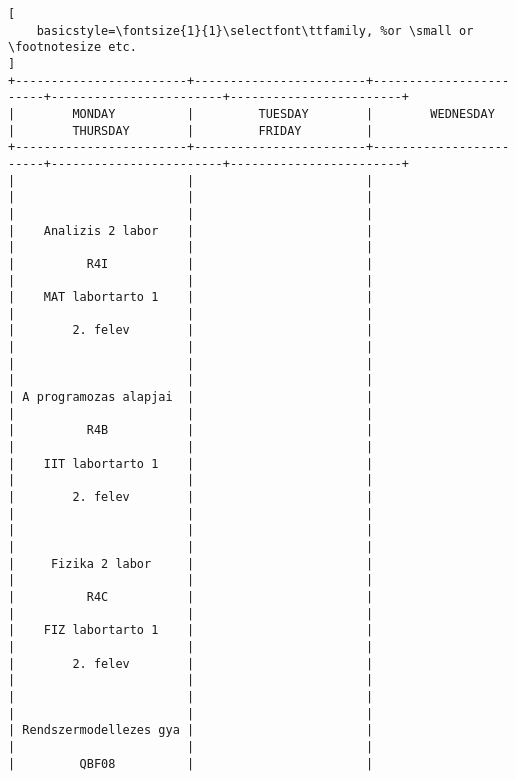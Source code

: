 \begin{lstlisting}[
    basicstyle=\fontsize{1}{1}\selectfont\ttfamily, %or \small or \footnotesize etc.
]
+------------------------+------------------------+------------------------+------------------------+------------------------+
|        MONDAY          |         TUESDAY        |        WEDNESDAY       |        THURSDAY        |         FRIDAY         |
+------------------------+------------------------+------------------------+------------------------+------------------------+
|                        |                        |                        |                        |                        | 
|                        |                        |                        |    Analizis 2 labor    |                        | 
|                        |                        |                        |          R4I           |                        | 
|                        |                        |                        |    MAT labortarto 1    |                        | 
|                        |                        |                        |        2. felev        |                        | 
|                        |                        |                        |                        |                        | 
|                        |                        |                        | A programozas alapjai  |                        | 
|                        |                        |                        |          R4B           |                        | 
|                        |                        |                        |    IIT labortarto 1    |                        | 
|                        |                        |                        |        2. felev        |                        | 
|                        |                        |                        |                        |                        | 
|                        |                        |                        |     Fizika 2 labor     |                        | 
|                        |                        |                        |          R4C           |                        | 
|                        |                        |                        |    FIZ labortarto 1    |                        | 
|                        |                        |                        |        2. felev        |                        | 
|                        |                        |                        |                        |                        | 
|                        |                        |                        | Rendszermodellezes gya |                        | 
|                        |                        |                        |         QBF08          |                        | 

\end{lstlisting}
